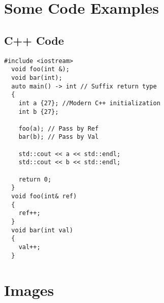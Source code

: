 \documentclass{article}
\theoremstyle{definition}
\theoremstyle{plain}
\theoremstyle{remark}
\begin{document}
\section{Some Code Examples}
\subsection{C++ Code}
\begin{lstlisting}
#include <iostream>
  void foo(int &);
  void bar(int);
  auto main() -> int // Suffix return type
  {
    int a {27}; //Modern C++ initialization
    int b {27};

    foo(a); // Pass by Ref
    bar(b); // Pass by Val

    std::cout << a << std::endl;
    std::cout << b << std::endl;

    return 0;
  }
  void foo(int& ref)
  {
    ref++;
  }
  void bar(int val)
  {
    val++;
  }
\end{lstlisting}
\newpage
\section{Images}
\end{document}
